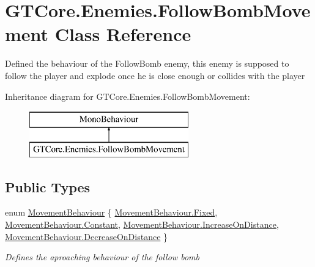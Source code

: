 \hypertarget{class_g_t_core_1_1_enemies_1_1_follow_bomb_movement}{}\section{G\+T\+Core.\+Enemies.\+Follow\+Bomb\+Movement Class Reference}
\label{class_g_t_core_1_1_enemies_1_1_follow_bomb_movement}


Defined the behaviour of the Follow\+Bomb enemy, this enemy is supposed to follow the player and explode once he is close enough or collides with the player  


Inheritance diagram for G\+T\+Core.\+Enemies.\+Follow\+Bomb\+Movement\+:\begin{figure}[H]
\begin{center}
\leavevmode
\includegraphics[height=2.000000cm]{class_g_t_core_1_1_enemies_1_1_follow_bomb_movement}
\end{center}
\end{figure}
\subsection*{Public Types}
\begin{DoxyCompactItemize}
\item 
enum \hyperlink{class_g_t_core_1_1_enemies_1_1_follow_bomb_movement_adf9532fc09595ec68cbe32713697fa48}{Movement\+Behaviour} \{ \hyperlink{class_g_t_core_1_1_enemies_1_1_follow_bomb_movement_adf9532fc09595ec68cbe32713697fa48a4457d440870ad6d42bab9082d9bf9b61}{Movement\+Behaviour.\+Fixed}, 
\hyperlink{class_g_t_core_1_1_enemies_1_1_follow_bomb_movement_adf9532fc09595ec68cbe32713697fa48acb17869fe51048b5a5c4c6106551a255}{Movement\+Behaviour.\+Constant}, 
\hyperlink{class_g_t_core_1_1_enemies_1_1_follow_bomb_movement_adf9532fc09595ec68cbe32713697fa48a9a451f1b8dbcf5ca79ee91948a53d4e0}{Movement\+Behaviour.\+Increase\+On\+Distance}, 
\hyperlink{class_g_t_core_1_1_enemies_1_1_follow_bomb_movement_adf9532fc09595ec68cbe32713697fa48a73e37c29fccdc1ddd535722e06ee00dd}{Movement\+Behaviour.\+Decrease\+On\+Distance}
 \}\begin{DoxyCompactList}\small\item\em Defines the aproaching behaviour of the follow bomb \end{DoxyCompactList}
\end{DoxyCompactItemize}
